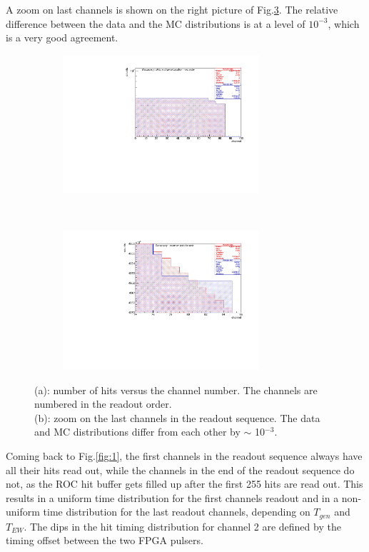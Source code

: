 A zoom on last channels is shown on the right picture of Fig.\ref{fig:2}.
The relative difference between the data and the MC distributions is at a level of $10^{-3}$,
which is a very good agreement.
\begin{figure}[!h]
  \begin{subfigure}[b]{\textwidth}
      \centering
      \includegraphics[width=0.8\textwidth]{figures/pdf/figure_00004_nhitsvschannel_roc_simulation_281.pdf}
      \caption{}
      \label{fig:tt1}
  \end{subfigure}
\\
  \begin{subfigure}[b]{\textwidth}
      \centering
      \includegraphics[width=0.8\textwidth]{figures/pdf/figure_00014_nhitsvschannel_roc_simulation_281.pdf}
      \caption{}
      \label{fig:tt2}
  \end{subfigure}
     \caption{(a): number of hits versus the channel number. The channels are numbered in the readout order.
     \\
     (b): zoom on the last channels in the readout sequence. The data and MC distributions
     differ from each other by $\sim$ 10$^{-3}$.}
     \label{fig:2}
\end{figure}
Coming back to Fig.\ref{fig:1}, the first channels in the readout sequence
always have all their hits read out,
while the channels in the end of the readout sequence do not,
as the ROC hit buffer gets filled up after
the first 255 hits are read out.
This results in a uniform time distribution for the first channels readout and in a non-uniform
time distribution for the last readout channels, depending on $T_{gen}$ and $T_{EW}$.
The dips in the hit timing distribution for channel 2 are defined by the timing offset
between the two FPGA pulsers. 


